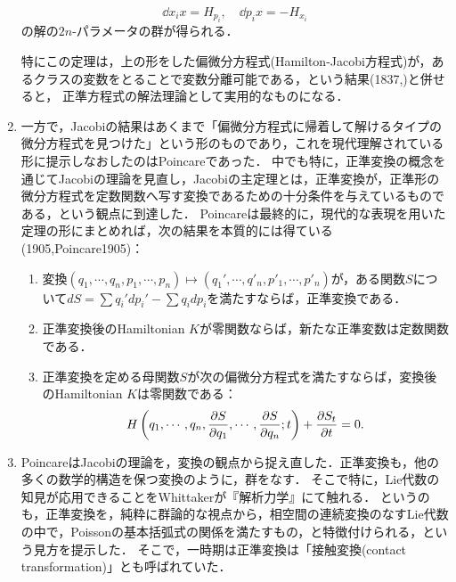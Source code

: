 \documentclass[uplatex, dvipdfmx]{jsarticle}
\begin{document}
\begin{enumerate}
\begin{theorem}
        \[\dd{x_i}{x}=H_{p_i},\quad\dd{p_i}{x}=-H_{x_i}\]
        の解の$2n$-パラメータの群が得られる．
    \end{theorem}
    特にこの定理は，上の形をした偏微分方程式(Hamilton-Jacobi方程式)が，あるクラスの変数をとることで変数分離可能である，という結果(1837,\cite{Jacobi37C})と併せると，
    正準方程式の解法理論として実用的なものになる．
    \item 一方で，Jacobiの結果はあくまで「偏微分方程式に帰着して解けるタイプの微分方程式を見つけた」という形のものであり，これを現代理解されている形に提示しなおしたのはPoincareであった．
    中でも特に，正準変換の概念を通じてJacobiの理論を見直し，Jacobiの主定理とは，正準変換が，正準形の微分方程式を定数関数へ写す変換であるための十分条件を与えているものである，という観点に到達した．
    Poincareは最終的に，現代的な表現を用いた定理の形にまとめれば，次の結果を本質的には得ている(1905,Poincare1905)：
    \begin{theorem}\mbox{}
        \begin{enumerate}
            \item 変換$(q_1,\cdots,q_n,p_1,\cdots,p_n)\mapsto(q_1',\cdots,q'_n,p'_1,\cdots,p'_n)$が，ある関数$S$について$dS=\sum q_i'dp_i'-\sum q_idp_i$を満たすならば，正準変換である．
            \item 正準変換後のHamiltonian $K$が零関数ならば，新たな正準変数は定数関数である．
            \item 正準変換を定める母関数$S$が次の偏微分方程式を満たすならば，変換後のHamiltonian $K$は零関数である：
            \[H\left(q_1,\cdots,q_n,\frac{\partial S}{\partial q_1},\cdots,\frac{\partial S}{\partial q_n};t\right)+\frac{\partial S_t}{\partial t}=0.\]
        \end{enumerate}
    \end{theorem}
    \item PoincareはJacobiの理論を，変換の観点から捉え直した．正準変換も，他の多くの数学的構造を保つ変換のように，群をなす．
    そこで特に，Lie代数の知見が応用できることをWhittakerが『解析力学』にて触れる．
    というのも，正準変換を，純粋に群論的な視点から，相空間の連続変換のなすLie代数の中で，Poissonの基本括弧式の関係を満たすもの，と特徴付けられる，という見方を提示した．
    そこで，一時期は正準変換は「接触変換(contact transformation)」とも呼ばれていた．


\end{enumerate}
\end{document}
